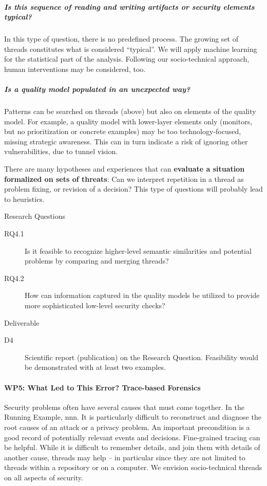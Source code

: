 \subparagraph*{Is this sequence of reading and writing artifacts or security elements typical?} In this type of question, there is no predefined process. The growing set of threads constitutes what is considered “typical”. We will apply machine learning for the statistical part of the analysis. Following our socio-technical approach, human interventions may be considered, too.

\subparagraph{Is a quality model populated in an unexpected way?} Patterns can be searched on threads (above) but also on elements of the quality model. For example, a quality model with lower-layer elements only (monitors, but no prioritization or concrete examples) may be too technology-focused, missing strategic awareness. This can in turn indicate a risk of ignoring other vulnerabilities, due to tunnel vision.

There are many hypotheses and experiences that can \textbf{evaluate a situation formalized on sets of threats}: Can we interpret repetition in a thread as problem fixing, or revision of a decision? This type of questions will probably lead to heuristics. 

Research Questions
\begin{description}
	\item[RQ4.1]	Is it feasible to recognize higher-level semantic similarities and potential problems by comparing and merging threads?
	\item[RQ4.2]	How can information captured in the quality models be utilized to provide more sophisticated low-level security checks?
\end{description}
	
Deliverable
\begin{description}
	\item[D4]	Scientific report (publication) on the Research Question. Feasibility would be demonstrated with at least two examples.
\end{description}

\paragraph*{WP5: What Led to This Error? Trace-based Forensics}
Security problems often have several causes that must come together. In the Running Example, nnn.
It is particularly difficult to reconstruct and diagnose the root causes of an attack or a privacy problem. An important precondition is a good record of potentially relevant events and decisions. Fine-grained tracing can be helpful. While it is difficult to remember details, and join them with details of another cause, threads may help – in particular since they are not limited to threads within a repository or on a computer. We envision socio-technical threads on all aspects of security.

